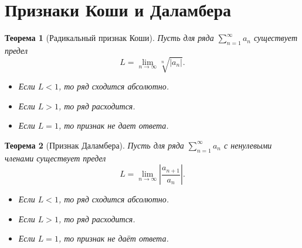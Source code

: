 \documentclass[a4paper, 12pt]{report}
\numberwithin{equation}{section}
\newtheorem*{theorem}{Теорема}
\begin{document}
	\section{Признаки Коши и Даламбера}
	\begin{theorem}
		[Радикальный признак Коши]
		Пусть для ряда $\sum_{n=1}^{\infty} a_n$ существует предел $$L = \lim_{n \to \infty} \sqrt[n]{|a_n|}.$$
		\begin{itemize}
			\item Если $L < 1$, то ряд сходится абсолютно.
			\item Если $L > 1$, то ряд расходится.
			\item Если $L = 1$, то признак не дает ответа.
		\end{itemize}
	\end{theorem}
	\begin{theorem}
		[Признак Даламбера]
		Пусть для ряда $\sum_{n=1}^{\infty} a_n$ с ненулевыми членами существует предел $$L = \lim_{n \to \infty} \left| \frac{a_{n+1}}{a_n} \right|.$$
		\begin{itemize}
			\item Если $L < 1$, то ряд сходится абсолютно.
			\item Если $L > 1$, то ряд расходится.
			\item Если $L = 1$, то признак не даёт ответа.
		\end{itemize}
	\end{theorem}
\end{document}
